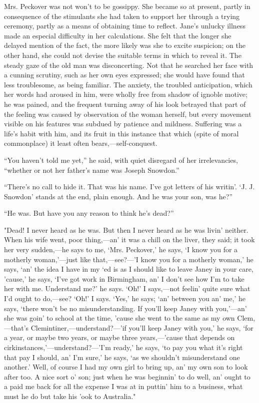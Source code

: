 Mrs. Peckover was not won't to be gossippy. She became so at present,
partly in consequence of the stimulants she had taken to support her
through a trying ceremony, partly as a means of obtaining time to
reflect. Jane's unlucky illness made an especial
{\protect\hypertarget{110}{}{}}difficulty in her calculations. She felt
that the longer she delayed mention of the fact, the more likely was she
to excite suspicion; on the other hand, she could not devise the
suitable terms in which to reveal it. The steady gaze of the old man was
disconcerting. Not that he searched her face with a cunning scrutiny,
such as her own eyes expressed; she would have found that less
troublesome, as being familiar. The anxiety, the troubled anticipation,
which her words had aroused in him, were wholly free from shadow of
ignoble motive; he was pained, and the frequent turning away of his look
betrayed that part of the feeling was caused by observation of the woman
herself, but every movement visible on his features was subdued by
patience and mildness. Suffering was a life's habit with him, and its
fruit in this instance that which (spite of moral commonplace) it least
often bears,---self-conquest.

``You haven't told me yet,'' he said, with quiet disregard of her
irrelevancies, ``whether or not her father's name was Joseph Snowdon.''

{\protect\hypertarget{111}{}{}}``There's no call to hide it. That was
his name. I've got letters of his writin'. `J. J. Snowdon' stands at the
end, plain enough. And he was your son, was he?''

``He was. But have you any reason to think he's dead?''

"Dead! I never heard as he was. But then I never heard as he was livin'
neither. When his wife went, poor thing,---an' it was a chill on the
liver, they said; it took her very sudden,---he says to me, `Mrs.
Peckover,' he says, `I know you for a motherly woman,'---just like
that,---see?---'I know you for a motherly woman,' he says, `an' the idea
I have in my `ed is as I should like to leave Janey in your care,
'cause,' he says, `I've got work in Birmingham, an' I don't see how I'm
to take her with me. Understand me?' he says. `Oh!' I says,---not
feelin' quite sure what I'd ought to do,---see? `Oh!' I says. `Yes,' he
says; `an' between you an' me,' he says, `there won't be no
misunderstanding. If you'll keep Janey with you,'---an' she was goin' to
school at the time, 'cause {\protect\hypertarget{112}{}{}}she went to
the same as my own Clem,---that's Clemintiner,---understand?---'if
you'll keep Janey with you,' he says, `for a year, or maybe two years,
or maybe three years,---'cause that depends on
cirkinstances,'---understand?---'I'm ready,' he says, `to pay you what
it's right that pay I should, an' I'm sure,' he says, `as we shouldn't
misunderstand one another.' Well, of course I had my own girl to bring
up, an' my own son to look after too. A nice sort o' son; just when he
was beginnin' to do well, an' ought to a paid me back for all the
expense I was at in puttin' him to a business, what must he do but take
his 'ook to Australia."

